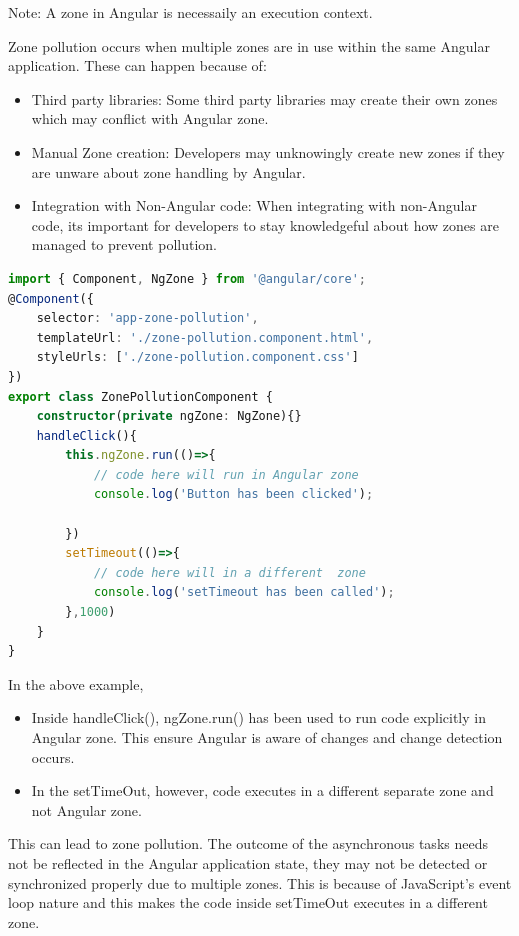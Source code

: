 \documentclass{report}
\begin{document}
Note: A zone in Angular is necessaily an execution context.

Zone pollution occurs when multiple zones are in use within the same Angular application. These can happen because of:
\begin{itemize}
	\item{Third party libraries: Some third party libraries may create their own zones which may conflict with Angular zone.}
	\item{Manual Zone creation: Developers may unknowingly create new zones if they are unware about zone handling by Angular.}
	\item{Integration with Non-Angular code: When integrating with non-Angular code, its important for developers to stay knowledgeful about how zones are managed to prevent pollution.}
\end{itemize}
\begin{lstlisting}[language=Typescript, caption=zone-pollution.component.ts]
import { Component, NgZone } from '@angular/core';
@Component({
	selector: 'app-zone-pollution',
	templateUrl: './zone-pollution.component.html',
	styleUrls: ['./zone-pollution.component.css']
})
export class ZonePollutionComponent {
	constructor(private ngZone: NgZone){}
	handleClick(){
		this.ngZone.run(()=>{
			// code here will run in Angular zone
			console.log('Button has been clicked');

		})
		setTimeout(()=>{
			// code here will in a different  zone
			console.log('setTimeout has been called');
		},1000)
	}
}
\end{lstlisting}
In the above example, 
\begin{itemize}
	\item{Inside handleClick(), ngZone.run() has been used to run code explicitly in Angular zone. This ensure Angular is aware of changes and change detection occurs.}
	\item{In the setTimeOut, however, code executes in a different separate zone and not Angular zone.}
\end{itemize}
This can lead to zone pollution. The outcome of the asynchronous tasks needs not be reflected in the Angular application state, they may not be detected or synchronized properly due to multiple zones. This is because of JavaScript’s event loop nature and this makes the code inside setTimeOut executes in a different zone.
\end{document}
